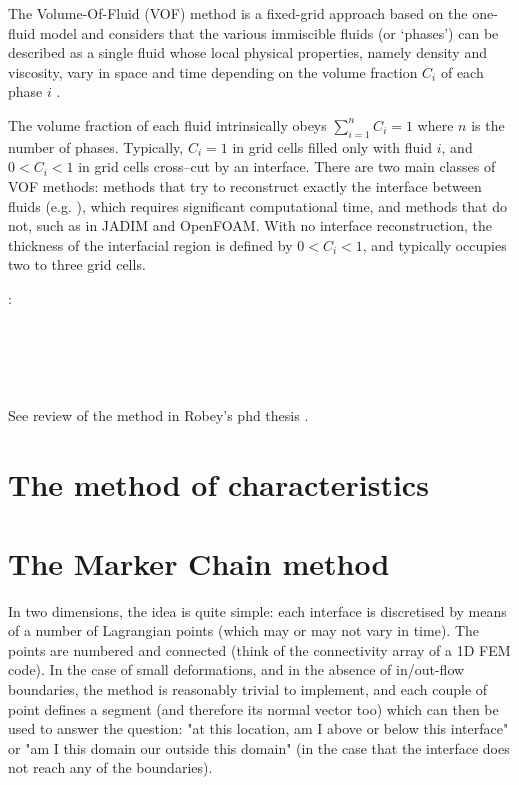 The Volume-Of-Fluid (VOF) method is a fixed-grid approach based on the one-fluid model 
and considers that the various immiscible fluids (or `phases') can be described as a 
single fluid whose local physical properties, namely density and viscosity, vary in space 
and time depending on the volume fraction $C_i$ of each phase $i$ 
\cite{hini81,youn82}. 

The volume fraction of each fluid intrinsically obeys $\sum \limits_{{i=1}}^n C_i = 1$ where $n$ is the number of phases. 
Typically, $C_i=1$ in grid cells filled only with fluid $i$, and $0<C_i<1$ in grid cells cross--cut by an interface. 
There are two main classes of VOF methods: methods that try to reconstruct exactly the interface between fluids (e.g. \cite{puth18}), which requires significant computational time, and methods that do not, such as in JADIM and OpenFOAM. 
With no interface reconstruction, the thickness of the interfacial region is defined by $0<C_i<1$, and typically occupies two to three grid cells. 

\Literature:\\
\textcite{hini81}\\
\textcite{dusm13}\\
\textcite{ropu19}\\
\textcite{logb20}\\
\textcite{lobg22}\\

See review of the method in Robey's phd thesis \cite{robe19}.

\section{The method of characteristics}


\cite{devv00a}

\section{The Marker Chain method}

In two dimensions, the idea is quite simple: each interface is discretised by means of a number
of Lagrangian points (which may or may not vary in time). The points are numbered and 
connected (think of the connectivity array of a 1D FEM code). In the case of small deformations, 
and in the absence of in/out-flow boundaries, the method is reasonably trivial to implement, and 
each couple of point defines a segment (and therefore its normal vector too) which can then be used
to answer the question: "at this location, am I above or below this interface" or "am I this domain our
outside this domain" (in the case that the interface does not reach any of the boundaries).

